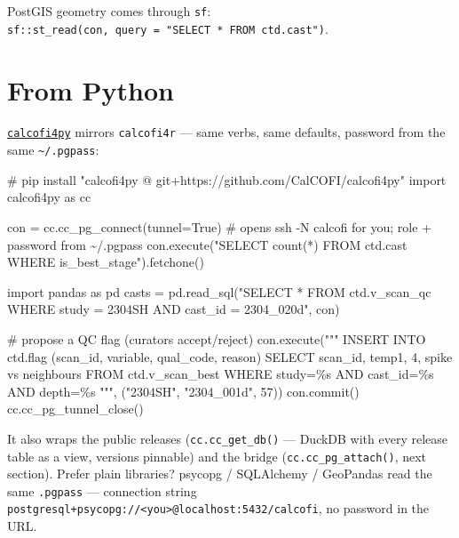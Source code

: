 \documentclass[
  letterpaper,
  DIV=11,
  numbers=noendperiod]{scrreprt}
\newenvironment{Shaded}{\begin{snugshade}}{\end{snugshade}}
\newcommand{\CommentTok}[1]{\textcolor[rgb]{0.37,0.37,0.37}{#1}}
\newcommand{\DecValTok}[1]{\textcolor[rgb]{0.68,0.00,0.00}{#1}}
\newcommand{\ImportTok}[1]{\textcolor[rgb]{0.00,0.46,0.62}{#1}}
\newcommand{\NormalTok}[1]{\textcolor[rgb]{0.00,0.23,0.31}{#1}}
\newcommand{\OperatorTok}[1]{\textcolor[rgb]{0.37,0.37,0.37}{#1}}
\newcommand{\SpecialCharTok}[1]{\textcolor[rgb]{0.37,0.37,0.37}{#1}}
\newcommand{\StringTok}[1]{\textcolor[rgb]{0.13,0.47,0.30}{#1}}
\newcommand{\VariableTok}[1]{\textcolor[rgb]{0.07,0.07,0.07}{#1}}
\begin{document}
PostGIS geometry comes through \texttt{sf}:
\texttt{sf::st\_read(con,\ query\ =\ "SELECT\ *\ FROM\ ctd.cast")}.

\section{From Python}\label{sec-python}

\href{https://github.com/CalCOFI/calcofi4py}{\texttt{calcofi4py}}
mirrors \texttt{calcofi4r} --- same verbs, same defaults, password from
the same \texttt{\textasciitilde{}/.pgpass}:

\begin{Shaded}
\begin{Highlighting}[]
\CommentTok{\# pip install "calcofi4py @ git+https://github.com/CalCOFI/calcofi4py"}
\ImportTok{import}\NormalTok{ calcofi4py }\ImportTok{as}\NormalTok{ cc}

\NormalTok{con }\OperatorTok{=}\NormalTok{ cc.cc\_pg\_connect(tunnel}\OperatorTok{=}\VariableTok{True}\NormalTok{)   }\CommentTok{\# opens \textasciigrave{}ssh {-}N calcofi\textasciigrave{} for you; role + password from \textasciitilde{}/.pgpass}
\NormalTok{con.execute(}\StringTok{"SELECT count(*) FROM ctd.cast WHERE is\_best\_stage"}\NormalTok{).fetchone()}

\ImportTok{import}\NormalTok{ pandas }\ImportTok{as}\NormalTok{ pd}
\NormalTok{casts }\OperatorTok{=}\NormalTok{ pd.read\_sql(}\StringTok{"SELECT * FROM ctd.v\_scan\_qc WHERE study = \textquotesingle{}2304SH\textquotesingle{} AND cast\_id = \textquotesingle{}2304\_020d\textquotesingle{}"}\NormalTok{, con)}

\CommentTok{\# propose a QC flag (curators accept/reject)}
\NormalTok{con.execute(}\StringTok{"""}
\StringTok{  INSERT INTO ctd.flag (scan\_id, variable, qual\_code, reason)}
\StringTok{  SELECT scan\_id, \textquotesingle{}temp1\textquotesingle{}, 4, \textquotesingle{}spike vs neighbours\textquotesingle{}}
\StringTok{  FROM ctd.v\_scan\_best WHERE study=}\SpecialCharTok{\%s}\StringTok{ AND cast\_id=}\SpecialCharTok{\%s}\StringTok{ AND depth=}\SpecialCharTok{\%s}
\StringTok{"""}\NormalTok{, (}\StringTok{"2304SH"}\NormalTok{, }\StringTok{"2304\_001d"}\NormalTok{, }\DecValTok{57}\NormalTok{))}
\NormalTok{con.commit()}
\NormalTok{cc.cc\_pg\_tunnel\_close()}
\end{Highlighting}
\end{Shaded}

It also wraps the public releases (\texttt{cc.cc\_get\_db()} --- DuckDB
with every release table as a view, versions pinnable) and the bridge
(\texttt{cc.cc\_pg\_attach()}, next section). Prefer plain libraries?
psycopg / SQLAlchemy / GeoPandas read the same \texttt{.pgpass} ---
connection string
\texttt{postgresql+psycopg://\textless{}you\textgreater{}@localhost:5432/calcofi},
no password in the URL.
\end{document}
